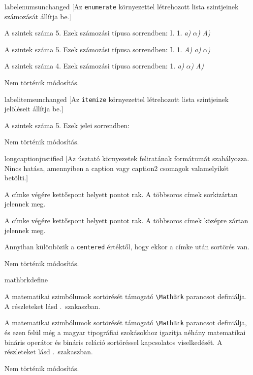 \documentclass[12pt]{article}
\begin{document}
\begin{description}
\begin{hunopt}{labelenums}{unchanged}
[Az \texttt{enumerate} környezettel létrehozott lista szintjeinek számozását állítja be.]
\item[hu-a]
A szintek száma 5.
Ezek számozási típusa sorrendben:
I. 1. \textit{a)} \textit{$\alpha$)} \textit{A)}
\item[hu-A]
A szintek száma 5.
Ezek számozási típusa sorrendben:
I. 1. \textit{A)} \textit{a)} \textit{$\alpha$)}
\item[hu-d]
A szintek száma 4.
Ezek számozási típusa sorrendben:
1. \textit{a)} \textit{$\alpha$)} \textit{A)}
\item[unchanged]
Nem történik módosítás.
\end{hunopt}

\begin{hunopt}{labelitems}{unchanged}
[Az \texttt{itemize} környezettel létrehozott lista szintjeinek jelöléseit állítja be.]
\item[hu]
A szintek száma 5.
Ezek jelei sorrendben:
\ \ \ \ 
\item[unchanged]
Nem történik módosítás.
\end{hunopt}

\begin{hunopt}{longcaption}{justified}
[Az úsztató környezetek feliratának formátumát szabályozza.
Nincs hatása, amennyiben a \textsf{caption} vagy \textsf{caption2} csomagok valamelyikét betölti.]
\item[justified]
A címke végére kettőspont helyett pontot rak.
A többsoros címek sorkizártan jelennek meg.
\item[centered]
A címke végére kettőspont helyett pontot rak.
A többsoros címek középre zártan jelennek meg.
\item[centernewline]
Annyiban különbözik a \texttt{centered} értéktől, hogy ekkor a címke után sortörés van.
\item[unchanged]
Nem történik módosítás.
\end{hunopt}

\begin{hunopt}{mathbrk}{define}
\item[define]
A matematikai szimbólumok sortörését támogató \verb|\MathBrk| parancsot definiálja.
A részleteket lásd .~szakaszban.
\item[fix]
A matematikai szimbólumok sortörését támogató \verb|\MathBrk| parancsot definiálja, és ezen felül még a magyar tipográfiai szokásokhoz igazítja néhány matematikai
bináris operátor és bináris reláció sortöréssel kapcsolatos viselkedését.
A részleteket lásd .~szakaszban.
\item[unchanged]
Nem történik módosítás.
\end{hunopt}


\end{description}
\end{document}
